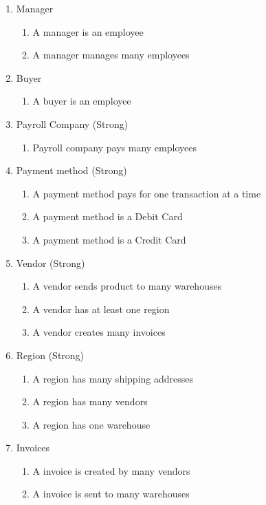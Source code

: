 \documentclass{article}
\begin{document}
\begin{enumerate}
\item Manager
\begin{enumerate}
	\item A manager is an employee
	\item A manager manages many employees
\end{enumerate}

\item Buyer
\begin{enumerate}
	\item A buyer is an employee
\end{enumerate}
	
\item Payroll Company (Strong)
\begin{enumerate}
	\item Payroll company pays many employees
\end{enumerate}

\item Payment method (Strong)
\begin{enumerate}
	\item A payment method pays for one transaction at a time
	\item A payment method is a Debit Card
	\item A payment method is a Credit Card
\end{enumerate}

\item Vendor (Strong)
\begin{enumerate}
	\item A vendor sends product to many warehouses
	\item A vendor has at least one region
	\item A vendor creates many invoices
\end{enumerate}
	
\item Region (Strong)
\begin{enumerate}
	\item A region has many shipping addresses
	\item A region has many vendors
	\item A region has one warehouse
\end{enumerate}
	
\item Invoices
\begin{enumerate}
	\item A invoice is created by many vendors
	\item A invoice is sent to many warehouses
\end{enumerate}
	

\end{enumerate}
\end{document}
